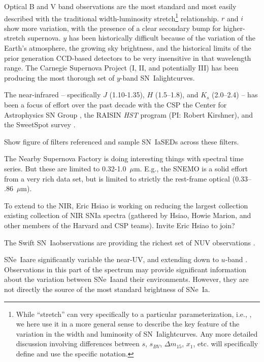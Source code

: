 \documentclass{aastex}
\newcommand{\snia}{SN~Ia}
\newcommand{\sneia}{SNe~Ia}
\newcommand{\tbd}{{\color{red}}}
\begin{document}
Optical B and V band observations are the most standard and most easily described with the traditional width-luminosity stretch\footnote{While ``stretch'' can very specifically to a particular parameterization, i.e., \citet{Goldhaber01}, we here use it in a more general sense to describe the key feature of the variation in the width and luminosity of \snia lightcurves.  Any more detailed discussion involving differences between $s$, $s_{BV}$, $\Delta m_{15}$, $x_1$, etc. will specifically define and use the specific notation.} relationship.  $r$ and $i$ show more variation, with the presence of a clear secondary bump for higher-stretch supernova.  $y$ has been historically difficult because of the variation of the Earth's atmosphere, the growing sky brightness, and the historical limits of the prior generation CCD-based detectors to be very insensitive in that wavelength range.  The Carnegie Supernova Project (I, II, and potentially III) has been producing the most thorough set of $y$-band \snia lightcurves.

The near-infrared -- specifically $J$ (1.10-1.35), $H$ (1.5--1.8), and $K_s$ (2.0--2.4) -- has been a focus of effort over the past decade with the CSP \citep{Contreras10, Krisciunas17, } the Center for Astrophysics SN Group \citep{Wood-Vasey08,Friedman15}, the RAISIN {\it HST} program (PI: Robert Kirshner), and the SweetSpot survey \citep{Weyant14, Weyant18}.

{\tbd Show figure of filters referenced and sample \snia SEDs across these filters.}

The Nearby Supernova Factory is doing interesting things with spectral time series.  But these are limited to 0.32-1.0~$\mu$m.  
E.g., the SNEMO \citep{Saunders18} is a solid effort from a very rich data set, but is limited to strictly the rest-frame optical ($0.33$--$.86$~$\mu$m).

To extend to the NIR, Eric Hsiao is working on reducing the largest collection existing collection of NIR SNIa spectra (gathered by Hsiao, Howie Marion, and other members of the Harvard and CSP teams).
{\tbd Invite Eric Hsiao to join?}

The Swift \snia observations are providing the richest set of NUV observations \citep{Brown??}.

\sneia are significantly variable the near-UV, and extending down to $u$-band \citep[cf][]{Jha??, Brown??}.  Observations in this part of the spectrum may provide significant information about the variation between \sneia and their environments.  However, they are not directly the source of the most standard brightness of \sneia.
\end{document}
